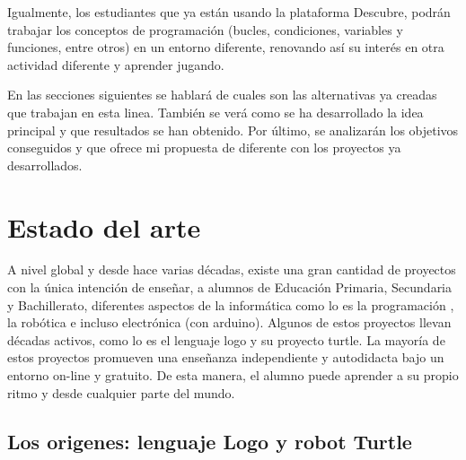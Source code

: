 Igualmente, los estudiantes que ya están usando la plataforma Descubre, podrán trabajar los conceptos de programación (bucles, condiciones, variables y funciones, entre otros) en un entorno diferente, renovando así su interés en otra actividad diferente y aprender jugando.




En las secciones siguientes se hablará de cuales son las alternativas ya creadas que trabajan en esta linea. También se verá como se ha desarrollado la idea principal y que resultados se han obtenido. Por último, se analizarán los objetivos conseguidos y que ofrece mi propuesta de diferente con los proyectos ya desarrollados.



\chapter{Estado del arte}\label{estado-arte}



A nivel global y desde hace varias décadas, existe una gran cantidad de proyectos con la única intención de enseñar, a alumnos de Educación Primaria, Secundaria y Bachillerato, diferentes aspectos de la informática como lo es la programación \cite{code-school,code-org,code-academy}, la robótica \cite{robomind-web,moway} e incluso electrónica (con \Gls{arduino}\cite{arduino}). Algunos de estos proyectos llevan décadas activos, como lo es el lenguaje \Gls{logo}\cite{logo} y su proyecto \Gls{turtle}\cite{logo-turtle}.
La mayoría de estos proyectos promueven una enseñanza independiente y autodidacta bajo un entorno on-line y gratuito. De esta manera, el alumno puede aprender a su propio ritmo y desde cualquier parte del mundo.


\section{{\color{red}Los origenes: }lenguaje Logo y robot Turtle}
\label{sec:Logo}

